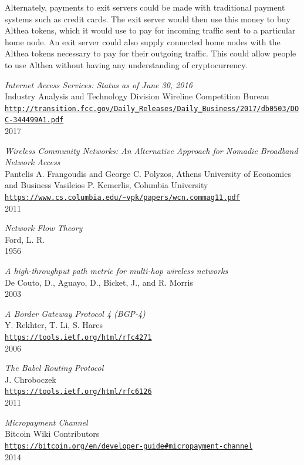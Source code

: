 \documentclass[11pt]{article}
\begin{document}
Alternately, payments to exit servers could be made with traditional payment systems such as credit cards. The exit server would then use this money to buy Althea tokens, which it would use to pay for incoming traffic sent to a particular home node. An exit server could also supply connected home nodes with the Althea tokens necessary to pay for their outgoing traffic. This could allow people to use Althea without having any understanding of cryptocurrency.

\begin{thebibliography}{99}

\emph{Internet Access Services: Status as of June 30, 2016}\\
Industry Analysis and Technology Division Wireline Competition Bureau\\
\texttt{\url{http://transition.fcc.gov/Daily_Releases/Daily_Business/2017/db0503/DOC-344499A1.pdf}}\\
2017

\emph{Wireless Community Networks:
An Alternative Approach for Nomadic Broadband Network Access}\\
Pantelis A. Frangoudis and George C. Polyzos, Athens University of Economics and Business Vasileios P. Kemerlis, Columbia University\\
\texttt{\url{https://www.cs.columbia.edu/~vpk/papers/wcn.commag11.pdf}}\\
2011

\emph{Network Flow Theory}\\
Ford, L. R.\\
1956

\emph{A high-throughput path metric for multi-hop wireless networks}\\
De Couto, D., Aguayo, D., Bicket, J., and R. Morris\\
2003

\emph{A Border Gateway Protocol 4 (BGP-4)}\\
Y. Rekhter, T. Li, S. Hares\\
\texttt{\url{https://tools.ietf.org/html/rfc4271}}\\
2006

\emph{The Babel Routing Protocol}\\
J. Chroboczek\\
\texttt{\url{https://tools.ietf.org/html/rfc6126}}\\
2011

\emph{Micropayment Channel}\\
Bitcoin Wiki Contributors\\
\texttt{\url{https://bitcoin.org/en/developer-guide\#micropayment-channel}}\\
2014


\end{thebibliography}
\end{document}
